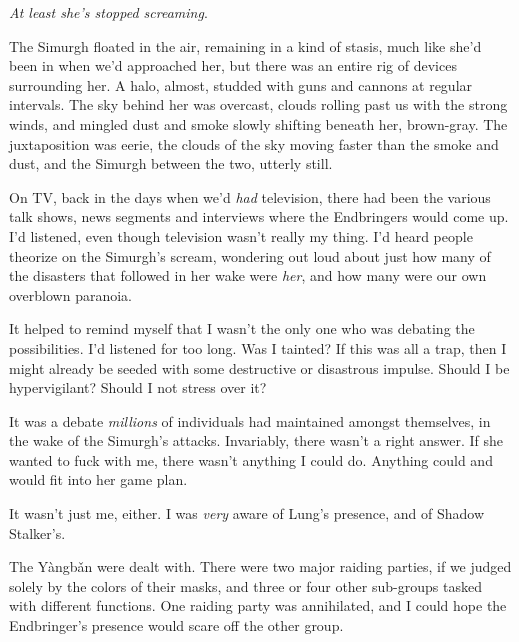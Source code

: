 





\emph{At least she's stopped screaming}.



The Simurgh floated in the air, remaining in a kind of stasis, much like she'd been in when we'd approached her, but there was an entire rig of devices surrounding her.  A halo, almost, studded with guns and cannons at regular intervals.  The sky behind her was overcast, clouds rolling past us with the strong winds, and mingled dust and smoke slowly shifting beneath her, brown-gray.  The juxtaposition was eerie, the clouds of the sky moving faster than the smoke and dust, and the Simurgh between the two, utterly still.



On TV, back in the days when we'd \emph{had} television, there had been the various talk shows, news segments and interviews where the Endbringers would come up.  I'd listened, even though television wasn't really my thing.  I'd heard people theorize on the Simurgh's scream, wondering out loud about just how many of the disasters that followed in her wake were \emph{her}, and how many were our own overblown paranoia.



It helped to remind myself that I wasn't the only one who was debating the possibilities.  I'd listened for too long.  Was I tainted?  If this was all a trap, then I might already be seeded with some destructive or disastrous impulse.  Should I be hypervigilant?  Should I not stress over it?



It was a debate \emph{millions} of individuals had maintained amongst themselves, in the wake of the Simurgh's attacks.  Invariably, there wasn't a right answer.  If she wanted to fuck with me, there wasn't anything I could do.  Anything could and would fit into her game plan.



It wasn't just me, either.  I was \emph{very }aware of Lung's presence, and of Shadow Stalker's.



The Y\`{a}ngb\v{a}n were dealt with.  There were two major raiding parties, if we judged solely by the colors of their masks, and three or four other sub-groups tasked with different functions.  One raiding party was annihilated, and I could hope the Endbringer's presence would scare off the other group.




